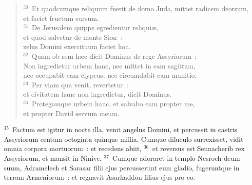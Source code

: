 \begin{flushleft}
\begin{verse}
${}^{30}$~Et quodcumque reliquum fuerit de domo Juda, mittet radicem deorsum,\\ et faciet fructum sursum.\\
${}^{31}$~De Jerusalem quippe egredientur reliqui\ae ,\\ et quod salvetur de monte Sion~:\\ zelus Domini exercituum faciet hoc.\\
${}^{32}$~Quam ob rem h\ae c dicit Dominus de rege Assyriorum~:\\ Non ingredietur urbem hanc, nec mittet in eam sagittam,\\ nec occupabit eam clypeus, nec circumdabit eam munitio.\\
${}^{33}$~Per viam qua venit, revertetur~:\\ et civitatem hanc non ingredietur, dicit Dominus.\\
${}^{34}$~Protegamque urbem hanc, et salvabo eam propter me,\\ et propter David servum meum.\end{verse}\end{flushleft}


${}^{35}$~Factum est igitur in nocte illa, venit angelus Domini, et percussit in castris Assyriorum centum octoginta quinque millia. Cumque diluculo surrexisset, vidit omnia corpora mortuorum~: et recedens abiit,
${}^{36}$~et reversus est Sennacherib rex Assyriorum, et mansit in Ninive.
${}^{37}$~Cumque adoraret in templo Nesroch deum suum, Adramelech et Sarasar filii ejus percusserunt eum gladio, fugeruntque in terram Armeniorum~: et regnavit Asarhaddon filius ejus pro eo.

